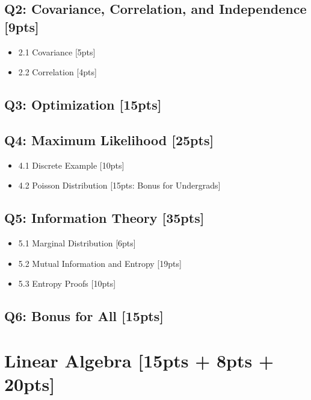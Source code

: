 \documentclass{article}
\begin{document}
\subsection*{Q2: Covariance, Correlation, and Independence [9pts]}
\begin{itemize}
    \item 2.1 Covariance [5pts]
    \item 2.2 Correlation [4pts]
\end{itemize}
\subsection*{Q3: Optimization [15pts]}
\subsection*{Q4: Maximum Likelihood [25pts]}
\begin{itemize}
    \item 4.1 Discrete Example [10pts]
    \item 4.2 Poisson Distribution [15pts: Bonus for Undergrads]
\end{itemize}
\subsection*{Q5: Information Theory [35pts]}
\begin{itemize}
    \item 5.1 Marginal Distribution [6pts]
    \item 5.2 Mutual Information and Entropy [19pts]
    \item 5.3 Entropy Proofs [10pts]
\end{itemize}
\subsection*{Q6: Bonus for All [15pts]}
\newpage
\section{Linear Algebra [15pts + 8pts + 20pts]}
\end{document}
